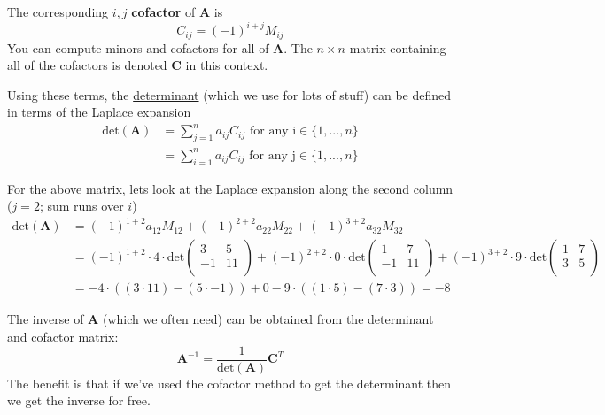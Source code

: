 \documentclass[12pt]{article}
\newcommand{\ve}[1]{\ensuremath{\mathbf{#1}}}
\begin{document}
The corresponding $i,j$ \textbf{cofactor} of $\ve{A}$ is
%
\begin{equation}
C_{ij} = (-1)^{i+j} M_{ij} \nonumber
\end{equation}
%
You can compute minors and cofactors for all of $\ve{A}$. The $n \times n$ matrix containing all of the cofactors is denoted $\ve{C}$ in this context.

Using these terms, the \underline{determinant} (which we use for lots of stuff) can be defined in terms of the Laplace expansion
\begin{align*}
\text{det}(\ve{A}) &= \sum_{j=1}^n a_{ij} C_{ij} \text{ for any i} \in \{1,...,n\} \\
%
&= \sum_{i=1}^n a_{ij} C_{ij} \text{ for any j} \in \{1,...,n\}
\end{align*}

For the above matrix, lets look at the Laplace expansion along the second column ($j = 2$; sum runs over $i$)
\begin{align}
\text{det}(\ve{A}) &= (-1)^{1+2} a_{12} M_{12} + (-1)^{2+2} a_{22} M_{22} + (-1)^{3+2} a_{32} M_{32} \nonumber \\
%
&= (-1)^{1+2} \cdot 4 \cdot \text{det}\begin{pmatrix}
        3 & 5 \\
        -1 & 11 \\ \end{pmatrix} + (-1)^{2+2} \cdot 0 \cdot \text{det}\begin{pmatrix} 
        1 & 7 \\
        -1 & 11 \\ \end{pmatrix} + (-1)^{3+2} \cdot 9 \cdot \text{det}\begin{pmatrix} 
        1 & 7 \\
        3 & 5 \\\end{pmatrix} \nonumber \\
%
&= -4 \cdot ((3 \cdot 11) - (5 \cdot -1)) + 0 -9 \cdot ((1 \cdot 5) - (7 \cdot 3)) = -8 \nonumber
\end{align}

The inverse of $\ve{A}$ (which we often need) can be obtained from the determinant and cofactor matrix:
%
\begin{equation}
\ve{A}^{-1} = \frac{1}{\text{det}(\ve{A})}\ve{C}^T \nonumber
\end{equation}
%
The benefit is that if we've used the cofactor method to get the determinant then we get the inverse for free. 
\end{document}
